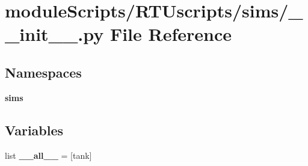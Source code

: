 \section{module\+Scripts/\+R\+T\+Uscripts/sims/\+\_\+\+\_\+init\+\_\+\+\_\+.py File Reference}
\label{sims_2____init_____8py}
\subsection*{Namespaces}
\begin{DoxyCompactItemize}
\item 
 {\bf sims}
\end{DoxyCompactItemize}
\subsection*{Variables}
\begin{DoxyCompactItemize}
\item 
list {\bf \+\_\+\+\_\+all\+\_\+\+\_\+} = [\textquotesingle{}tank\textquotesingle{}]
\end{DoxyCompactItemize}
